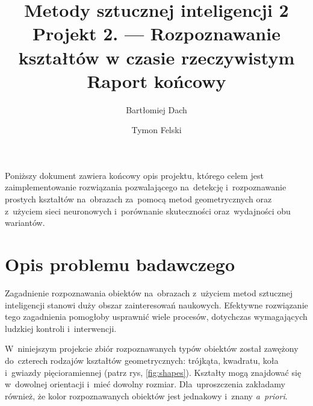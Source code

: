 \documentclass[11pt,a4paper]{article}
\begin{document}
\title{Metody sztucznej inteligencji 2 \\
\Large{
    Projekt 2. --- Rozpoznawanie kształtów w czasie rzeczywistym \\
    Raport końcowy
}}
\author{Bartłomiej Dach \and Tymon Felski}
\maketitle

Poniższy dokument zawiera końcowy opis projektu, którego celem jest zaimplementowanie rozwiązania pozwalającego na~detekcję i~rozpoznawanie prostych kształtów na~obrazach za~pomocą metod geometrycznych oraz z~użyciem sieci neuronowych i~porównanie skuteczności oraz~wydajności obu wariantów.

\section{Opis problemu badawczego}

Zagadnienie rozpoznawania obiektów na~obrazach z~użyciem metod sztucznej inteligencji stanowi duży obszar zainteresowań naukowych.
Efektywne rozwiązanie tego zagadnienia pomogłoby usprawnić wiele procesów, dotychczas wymagających ludzkiej kontroli i~interwencji.

W~niniejszym projekcie zbiór rozpoznawanych typów obiektów został zawężony do~czterech rodzajów kształtów geometrycznych: trójkąta, kwadratu, koła i~gwiazdy pięcioramiennej (patrz rys, \ref{fig:shapes}).
Kształty mogą znajdować się w~dowolnej orientacji i~mieć dowolny rozmiar.
Dla~uproszczenia zakładamy również, że kolor rozpoznawanych obiektów jest jednakowy i~znany \emph{a~priori}.
\end{document}
